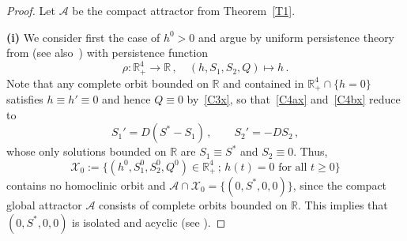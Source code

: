 \documentclass[reqno,11pt]{amsart}
\numberwithin{equation}{section}
\newcommand{\R}{\mathbb{R}}
\begin{document}
\begin{proof}
Let $\mathcal{A}$ be the 
compact attractor from Theorem~\ref{T1}.

{\bf (i)} We consider first the case of $h^0>0$ and argue by uniform persistence theory from \cite[Section~8.3]{SmithThieme2011}  (see also~\cite{HaleWaltman1989})  with persistence function $$\rho:\R_+^4\to \R\,,\quad (h,S_1,S_2,Q)\mapsto h\,.$$
Note that any complete orbit bounded on $\R$ and contained in $\R_+^4\cap\{h=0\}$ satisfies $h\equiv h'\equiv0$ and hence $Q\equiv0$ by~\eqref{C3x}, so that~\eqref{C4ax} and~\eqref{C4bx} reduce to
\begin{equation*}
S_1'=D(S^*-S_1)\,,\qquad S_2'=-DS_2\,,
\end{equation*}
whose only solutions bounded on $\R$ are $S_1\equiv S^*$ and $S_2\equiv0$. Thus, $$\mathcal{X}_0:=\{(h^0,S_1^0,S_2^0,Q^0)\in\R_+^4\,;\, h(t)=0 \text{ for all } t\ge 0\}$$
contains no homoclinic orbit and $\mathcal{A}\cap \mathcal{X}_0=\{(0,S^*,0,0)\}$, since the compact global attractor $\mathcal{A}$ consists of complete orbits bounded on $\R$. This implies that $(0,S^*,0,0)$ is isolated and acyclic (see \cite[Definition~8.14]{SmithThieme2011}).


\end{proof}
\end{document}
